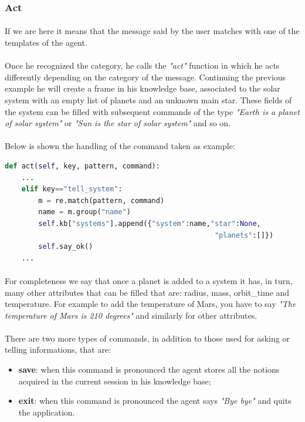 \documentclass[12pt, a4paper]{article}
\begin{document}
\subsubsection{Act}\label{2.2.2}
\paragraph{}
If we are here it means that the message said by the user matches with one of the templates of the agent.
\paragraph{}
Once he recognized the category, he calls the \textit{"act"} function in which he acts differently depending on the category of the message. Continuing the previous example he will create a frame in his knowledge base, associated to the solar system with an empty list of planets and an unknown main star. These fields of the system can be filled with subsequent commands of the type \textit{"Earth is a planet of solar system"} or \textit{"Sun is the star of solar system"} and so on. 
\paragraph{}
Below is shown the handling of the command taken as example:
\vspace{1em}
\begin{lstlisting}[language=Python]
def act(self, key, pattern, command):
	...
	elif key=="tell_system":
		m = re.match(pattern, command)
		name = m.group("name")
		self.kb["systems"].append({"system":name,"star":None,
												  "planets":[]})
		self.say_ok()
	...
\end{lstlisting}
\paragraph{}
For completeness we say that once a planet is added to a system it has, in turn, many other attributes that can be filled that are: radius, mass, orbit\_time and temperature. For example to add the temperature of Mars, you have to say \textit{"The temperature of Mars is 210 degrees"} and similarly for other attributes.
\paragraph{}
There are two more types of commands, in addition to those used for asking or telling informations, that are:
\begin{itemize}
\item \textbf{save}: when this command is pronounced the agent stores all the notions acquired in the current session in his knowledge base;
\item \textbf{exit}: when this command is pronounced the agent says \textit{"Bye bye"} and quits the application.
\end{itemize}
\end{document}
